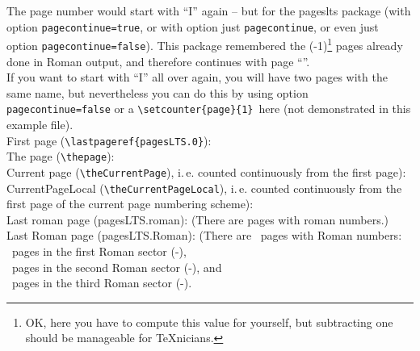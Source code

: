 \documentclass[british]{article}
\begin{document}
The page number would start with \textquotedblleft I\textquotedblright{} again --
but for the \textsf{pageslts} package (with option \texttt{pagecontinue=true},
or with option just \texttt{pagecontinue}, or even just
 option \texttt{pagecontinue=false}).
This package remembered the (-1)\footnote{%
OK, here you have to compute this value for yourself, but %
subtracting one should be manageable for \TeX{}nicians.} pages already
done in Roman output, and therefore continues with page
\textquotedblleft \thepage \textquotedblright .\\
If you want to start with \textquotedblleft I\textquotedblright{} all
over again, you will have two pages with the same name,
but nevertheless you can do this by using option \texttt{pagecontinue=false}
or a \verb|\setcounter{page}{1}|\ here (not demonstrated in this example file).\\

\noindent First page (\verb|\lastpageref{pagesLTS.0}|):
 \\

\noindent The page (\verb|\thepage|): \thepage \\

\noindent Current page (\verb|\theCurrentPage|),
i.\,e. counted continuously from the first page): \theCurrentPage \\

\noindent CurrentPageLocal (\verb|\theCurrentPageLocal|),
i.\,e. counted continuously from the first page of the
current page numbering scheme): \theCurrentPageLocal \\

\noindent Last roman page (pagesLTS.roman): 
(There are  pages with roman numbers.)\\

\noindent Last Roman page (pagesLTS.Roman): 
(There are ~pages with Roman numbers:\\
~pages in the first Roman sector
(\pageref{Roman}{\hskip3em }-),\\
~pages in the second Roman sector
(\pageref{Roman2}{\hskip3em }-), and\\
~pages in the third Roman sector
(\pageref{Roman3}{\hskip3em }-).\\
\end{document}
